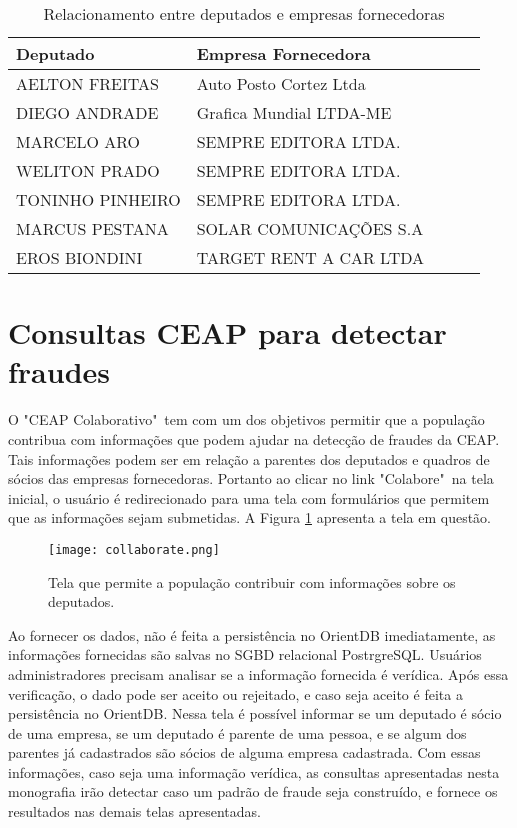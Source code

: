 \begin{table}[h!]
\centering
\caption{Relacionamento entre deputados e empresas fornecedoras}
\begin{tabular}{|l|l|l|l|l|}
\hline
Deputado & Empresa Fornecedora \\ \hline
AELTON FREITAS & Auto Posto Cortez Ltda \\ \hline
DIEGO ANDRADE & Grafica Mundial LTDA-ME \\ \hline
MARCELO ARO & SEMPRE EDITORA LTDA. \\ \hline
WELITON PRADO & SEMPRE EDITORA LTDA. \\ \hline
TONINHO PINHEIRO & SEMPRE EDITORA LTDA. \\ \hline
MARCUS PESTANA & SOLAR COMUNICAÇÕES S.A \\ \hline
EROS BIONDINI & TARGET RENT A CAR LTDA \\ \hline
\end{tabular}
\label{table:relation_deputies_companies}
\end{table}

\section{Consultas CEAP para detectar fraudes}

O "CEAP Colaborativo"\ tem com um dos objetivos permitir que a população contribua com informações que podem ajudar na detecção de fraudes da CEAP. Tais informações podem ser em relação a parentes dos deputados e quadros de sócios das empresas fornecedoras. Portanto ao clicar no link "Colabore"\ na tela inicial, o usuário é redirecionado para uma tela com formulários que permitem que as informações sejam submetidas. A Figura \ref{fig:collaborate} apresenta a tela em questão.

\begin{figure}[H]
\centering
\texttt{[image: collaborate.png]}
\caption{Tela que permite a população contribuir com informações sobre os deputados.}
\label{fig:collaborate}
\end{figure}

Ao fornecer os dados, não é feita a persistência no OrientDB imediatamente, as informações fornecidas são salvas no SGBD relacional PostrgreSQL. Usuários administradores precisam analisar se a informação fornecida é verídica. Após essa verificação, o dado pode ser aceito ou rejeitado, e caso seja aceito é feita a persistência no OrientDB. Nessa tela é possível informar se um deputado é sócio de uma empresa, se um deputado é parente de uma pessoa, e se algum dos parentes já cadastrados são sócios de alguma empresa cadastrada. Com essas informações, caso seja uma informação verídica, as consultas apresentadas nesta monografia irão detectar caso um padrão de fraude seja construído, e fornece os resultados nas demais telas apresentadas.

